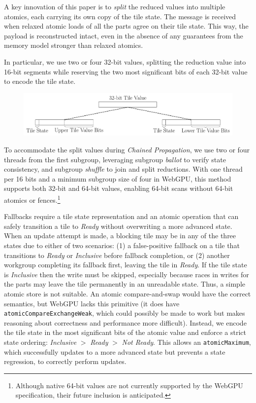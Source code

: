 \documentclass[sigconf]{acmart}
\begin{document}
A key innovation of this paper is to \emph{split} the reduced values into multiple atomics, each carrying its own copy of the tile state. The message is received when relaxed atomic loads of all the parts agree on their tile state. This way, the payload is reconstructed intact, even in the absence of any guarantees from the memory model stronger than relaxed atomics.

In particular, we use two or four 32-bit values, splitting the reduction value into 16-bit segments while reserving the two most significant bits of each 32-bit value to encode the tile state.
\begin{figure}[h!]
  \centering
  \includegraphics[width=\linewidth]{graphics/split.pdf}
\end{figure}

To accommodate the split values during \emph{Chained Propagation}, we use two or four threads from the first subgroup, leveraging subgroup \emph{ballot} to verify state consistency, and subgroup \emph{shuffle} to join and split reductions. With one thread per 16 bits and a minimum subgroup size of four in WebGPU, this method supports both 32-bit and 64-bit values, enabling 64-bit scans without 64-bit atomics or fences.\footnote{Although native 64-bit values are not currently supported by the WebGPU specification, their future inclusion is anticipated.}

Fallbacks require a tile state representation and an atomic operation that can safely transition a tile to \emph{Ready} without overwriting a more advanced state. When an update attempt is made, a blocking tile may be in any of the three states due to either of two scenarios: (1) a false-positive fallback on a tile that transitions to \emph{Ready} or \emph{Inclusive} before fallback completion, or (2) another workgroup completing its fallback first, leaving the tile in \emph{Ready}. If the tile state is \emph{Inclusive} then the write must be skipped, especially because races in writes for the parts may leave the tile permanently in an unreadable state. Thus, a simple atomic store is not suitable. An atomic compare-and-swap would have the correct semantics, but WebGPU lacks this primitive (it does have \texttt{atomicCompareExchangeWeak}, which could possibly be made to work but makes reasoning about correctness and performance more difficult). Instead, we encode the tile state in the most significant bits of the atomic value and enforce a strict state ordering: \emph{Inclusive} $>$ \emph{Ready} $>$ \emph{Not Ready}. This allows an \texttt{atomicMaximum}, which successfully updates to a more advanced state but prevents a state regression, to correctly perform updates.
\end{document}
